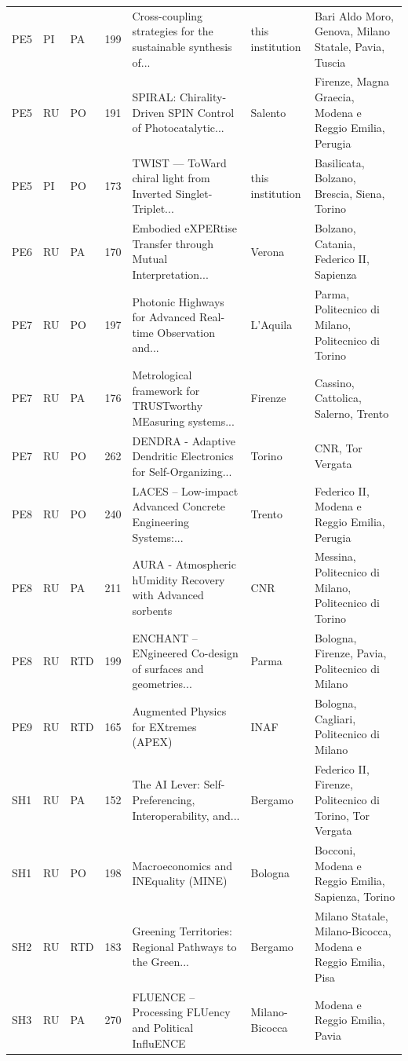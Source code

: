 \documentclass[11pt,a4paper]{article}
\begin{document}
{\begin{longtable}{lllrp{4.2cm}p{2cm}p{3.2cm}}
PE5 & PI & PA & 199 & Cross-coupling strategies for the sustainable synthesis of... & this institution & Bari Aldo Moro, Genova, Milano Statale, Pavia, Tuscia \\
PE5 & RU & PO & 191 & SPIRAL: Chirality-Driven SPIN Control of Photocatalytic... & Salento & Firenze, Magna Graecia, Modena e Reggio Emilia, Perugia \\
PE5 & PI & PO & 173 & TWIST — ToWard chiral light from Inverted Singlet-Triplet... & this institution & Basilicata, Bolzano, Brescia, Siena, Torino \\
PE6 & RU & PA & 170 & Embodied eXPERtise Transfer through Mutual Interpretation... & Verona & Bolzano, Catania, Federico II, Sapienza \\
PE7 & RU & PO & 197 & Photonic Highways for Advanced Real-time Observation and... & L'Aquila & Parma, Politecnico di Milano, Politecnico di Torino \\
PE7 & RU & PA & 176 & Metrological framework for TRUSTworthy MEasuring systems... & Firenze & Cassino, Cattolica, Salerno, Trento \\
PE7 & RU & PO & 262 & DENDRA - Adaptive Dendritic Electronics for Self-Organizing... & Torino & CNR, Tor Vergata \\
PE8 & RU & PO & 240 & LACES – Low-impact Advanced Concrete Engineering Systems:... & Trento & Federico II, Modena e Reggio Emilia, Perugia \\
PE8 & RU & PA & 211 & AURA - Atmospheric hUmidity Recovery with Advanced sorbents & CNR & Messina, Politecnico di Milano, Politecnico di Torino \\
PE8 & RU & RTD & 199 & ENCHANT – ENgineered Co-design of surfaces and geometries... & Parma & Bologna, Firenze, Pavia, Politecnico di Milano \\
PE9 & RU & RTD & 165 & Augmented Physics for EXtremes (APEX) & INAF & Bologna, Cagliari, Politecnico di Milano \\
SH1 & RU & PA & 152 & The AI Lever: Self-Preferencing, Interoperability, and... & Bergamo & Federico II, Firenze, Politecnico di Torino, Tor Vergata \\
SH1 & RU & PO & 198 & Macroeconomics and INEquality (MINE) & Bologna & Bocconi, Modena e Reggio Emilia, Sapienza, Torino \\
SH2 & RU & RTD & 183 & Greening Territories: Regional Pathways to the Green... & Bergamo & Milano Statale, Milano-Bicocca, Modena e Reggio Emilia, Pisa \\
SH3 & RU & PA & 270 & FLUENCE – Processing FLUency and Political InfluENCE & Milano-Bicocca & Modena e Reggio Emilia, Pavia \\

\end{longtable}}
\end{document}
